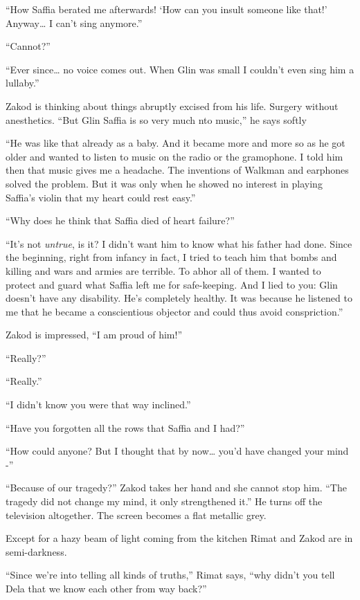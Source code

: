 \documentclass[twoside,11pt]{book}
\begin{document}
``How Saffia berated me afterwards! `How can you insult someone like that!' Anyway{\dots} I can't sing
anymore.''

``Cannot?''

``Ever since{\dots}  no voice  comes out. When Glin was small I couldn't even sing him a
lullaby.''

Zakod is thinking about things abruptly excised from his life. Surgery without anesthetics. ``But Glin
Saffia is so very much nto music,'' he says softly

``He was like that already as a baby. And it became more and more so as he got older and wanted to listen
to music on the radio or the gramophone. I told him then that music gives me a headache. The inventions of Walkman and
earphones solved the problem. But it was only when he showed no interest in playing Saffia's violin that my heart could
rest easy.''

``Why does he think that Saffia died of heart failure?''

``It's not \textit{untrue}, is it? I didn't want him to know what his father had done. Since the beginning,
right from infancy in fact, I tried to teach him that bombs and killing and wars and armies are terrible.  To abhor all
of them. I wanted to protect and guard what Saffia left me for safe-keeping. And I lied to you: Glin doesn't have any
disability. He's completely healthy.  It was because he listened to me that he became a conscientious objector and
could thus avoid conspriction.''

Zakod is impressed, ``I am proud of him!''

``Really?''

``Really.''

``I didn't know you were that way inclined.''

``Have you forgotten all the rows that Saffia and I had?''

``How could anyone? But I thought that by now{\dots} you'd have changed your mind -''

``Because of our tragedy?'' Zakod takes her hand and she cannot stop him. ``The
tragedy did not change my mind, it only strengthened it.'' He turns off the television altogether. The
screen becomes a flat metallic grey.

Except for a hazy beam of light coming
from the kitchen Rimat and
Zakod are in semi-darkness.

``Since we're into telling all kinds of truths,'' Rimat says, ``why didn't you
tell Dela that we know each other from way back?''
\end{document}
